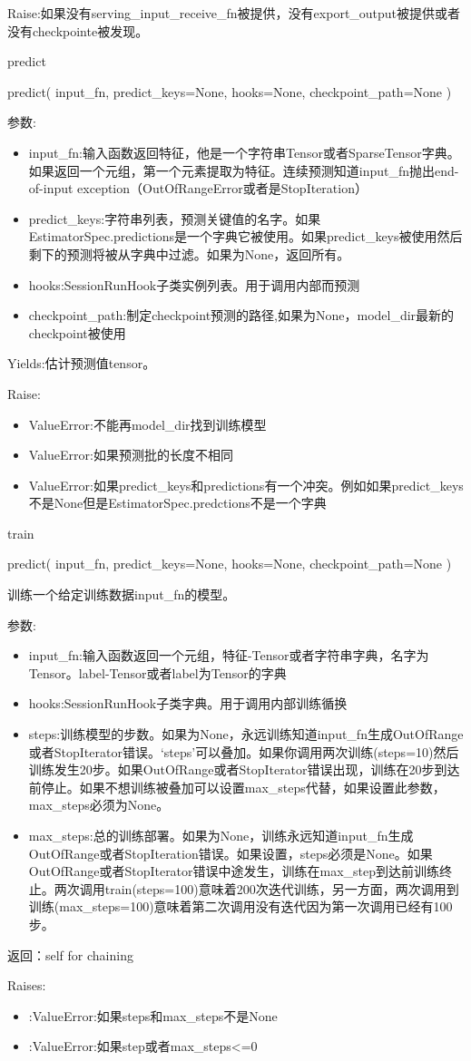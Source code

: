 Raise:如果没有serving\_input\_receive\_fn被提供，没有export\_output被提供或者没有checkpointe被发现。

predict
\begin{python}
predict(
    input_fn,
    predict_keys=None,
    hooks=None,
    checkpoint_path=None
)
\end{python}
参数:
\begin{itemize}
	\item input\_fn:输入函数返回特征，他是一个字符串Tensor或者SparseTensor字典。如果返回一个元组，第一个元素提取为特征。连续预测知道input\_fn抛出end-of-input exception（OutOfRangeError或者是StopIteration）
	\item predict\_keys:字符串列表，预测关键值的名字。如果EstimatorSpec.predictions是一个字典它被使用。如果predict\_keys被使用然后剩下的预测将被从字典中过滤。如果为None，返回所有。
	\item hooks:SessionRunHook子类实例列表。用于调用内部而预测
	\item checkpoint\_path:制定checkpoint预测的路径,如果为None，model\_dir最新的checkpoint被使用
\end{itemize}
Yields:估计预测值tensor。

Raise:
\begin{itemize}
	\item ValueError:不能再model\_dir找到训练模型
	\item ValueError:如果预测批的长度不相同
	\item ValueError:如果predict\_keys和predictions有一个冲突。例如如果predict\_keys不是None但是EstimatorSpec.predctions不是一个字典
\end{itemize}
train

\begin{python}
predict(
    input_fn,
    predict_keys=None,
    hooks=None,
    checkpoint_path=None
)
\end{python}
训练一个给定训练数据input\_fn的模型。

参数:
\begin{itemize}
	\item input\_fn:输入函数返回一个元组，特征-Tensor或者字符串字典，名字为Tensor。label-Tensor或者label为Tensor的字典
	\item hooks:SessionRunHook子类字典。用于调用内部训练循换
	\item steps:训练模型的步数。如果为None，永远训练知道input\_fn生成OutOfRange或者StopIterator错误。‘steps’可以叠加。如果你调用两次训练(steps=10)然后训练发生20步。如果OutOfRange或者StopIterator错误出现，训练在20步到达前停止。如果不想训练被叠加可以设置max\_steps代替，如果设置此参数，max\_steps必须为None。
	\item max\_steps:总的训练部署。如果为None，训练永远知道input\_fn生成OutOfRange或者StopIteration错误。如果设置，steps必须是None。如果OutOfRange或者StopIterator错误中途发生，训练在max\_step到达前训练终止。两次调用train(steps=100)意味着200次迭代训练，另一方面，两次调用到训练(max\_steps=100)意味着第二次调用没有迭代因为第一次调用已经有100步。
\end{itemize}
返回：self for chaining

Raises:
\begin{itemize}
	\item:ValueError:如果steps和max\_steps不是None
	\item:ValueError:如果step或者max\_steps<=0
\end{itemize}
